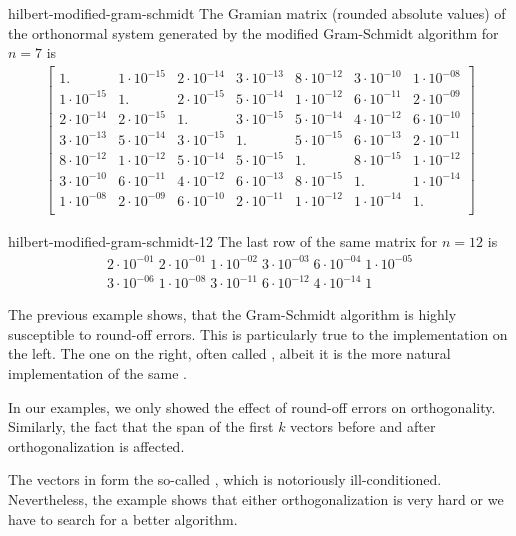 \begin{Example}{hilbert-modified-gram-schmidt}
  The Gramian matrix (rounded absolute values) of the orthonormal system generated by the
  modified Gram-Schmidt algorithm for $n=7$ is\small
  \begin{gather*}
    \begin{bmatrix}
      1. & 1\cdot 10^{-15} & 2\cdot 10^{-14} & 3\cdot 10^{-13} & 8\cdot 10^{-12} & 3\cdot 10^{-10} & 1\cdot 10^{-08}\\
      1\cdot 10^{-15} & 1. & 2\cdot 10^{-15} & 5\cdot 10^{-14} & 1\cdot 10^{-12} & 6\cdot 10^{-11} & 2\cdot 10^{-09}\\
      2\cdot 10^{-14} & 2\cdot 10^{-15} & 1. & 3\cdot 10^{-15} & 5\cdot 10^{-14} & 4\cdot 10^{-12} & 6\cdot 10^{-10}\\
      3\cdot 10^{-13} & 5\cdot 10^{-14} & 3\cdot 10^{-15} & 1. & 5\cdot 10^{-15} & 6\cdot 10^{-13} & 2\cdot 10^{-11}\\
      8\cdot 10^{-12} & 1\cdot 10^{-12} & 5\cdot 10^{-14} & 5\cdot 10^{-15} & 1. & 8\cdot 10^{-15} & 1\cdot 10^{-12}\\
      3\cdot 10^{-10} & 6\cdot 10^{-11} & 4\cdot 10^{-12} & 6\cdot 10^{-13} & 8\cdot 10^{-15} & 1. & 1\cdot 10^{-14}\\
      1\cdot 10^{-08} & 2\cdot 10^{-09} & 6\cdot 10^{-10} & 2\cdot 10^{-11} & 1\cdot 10^{-12} & 1\cdot 10^{-14} & 1.\\
    \end{bmatrix}
  \end{gather*}
\end{Example}

\begin{Example}{hilbert-modified-gram-schmidt-12}
  The last row of the same matrix for $n=12$ is\small
  \begin{multline*}
    2\cdot 10^{-01} \; 2\cdot 10^{-01} \; 1\cdot 10^{-02} \;
    3\cdot 10^{-03} \; 6\cdot 10^{-04} \; 1\cdot 10^{-05} \\
    3\cdot 10^{-06} \; 1\cdot 10^{-08} \;
    3\cdot 10^{-11} \; 6\cdot 10^{-12} \; 4\cdot 10^{-14} \; 1
  \end{multline*}
\end{Example}

\begin{remark}
  The previous example shows, that the Gram-Schmidt algorithm is
  highly susceptible to round-off errors. This is particularly true to
  the implementation on the left. The one on the right, often called
  , albeit it is the more natural
  implementation of the same .

  In our examples, we only showed the effect of round-off errors on
  orthogonality. Similarly, the fact that the span of the first $k$
  vectors before and after orthogonalization is affected.

  The vectors in  form
  the so-called , which is notoriously
  ill-conditioned. Nevertheless, the example shows that either
  orthogonalization is very hard or we have to search for a better
  algorithm.
\end{remark}

